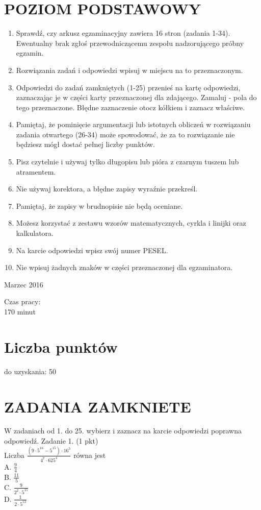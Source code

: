 \documentclass[10pt]{article}
\begin{document}
\section*{POZIOM PODSTAWOWY}
\begin{enumerate}
  \item Sprawdź, czy arkusz egzaminacyjny zawiera 16 stron (zadania 1-34). Ewentualny brak zgłoś przewodniczącemu zespołu nadzorującego próbny egzamin.
  \item Rozwiązania zadań i odpowiedzi wpisuj w miejscu na to przeznaczonym.
  \item Odpowiedzi do zadań zamkniętych (1-25) przenieś na kartę odpowiedzi, zaznaczając je w części karty przeznaczonej dla zdającego. Zamaluj - pola do tego przeznaczone. Błędne zaznaczenie otocz kółkiem i zaznacz właściwe.
  \item Pamiętaj, że pominięcie argumentacji lub istotnych obliczeń w rozwiązaniu zadania otwartego (26-34) może spowodować, że za to rozwiązanie nie będziesz mógł dostać pełnej liczby punktów.
  \item Pisz czytelnie i używaj tylko długopisu lub pióra z czarnym tuszem lub atramentem.
  \item Nie używaj korektora, a błędne zapisy wyraźnie przekreśl.
  \item Pamiętaj, że zapisy w brudnopisie nie będą oceniane.
  \item Możesz korzystać z zestawu wzorów matematycznych, cyrkla i linijki oraz kalkulatora.
  \item Na karcie odpowiedzi wpisz swój numer PESEL.
  \item Nie wpisuj żadnych znaków w części przeznaczonej dla egzaminatora.
\end{enumerate}

Marzec 2016

Czas pracy:\\
170 minut

\section*{Liczba punktów}
do uzyskania: 50

\section*{ZADANIA ZAMKNIETE}
W zadaniach od 1. do 25. wybierz i zaznacz na karcie odpowiedzi poprawna odpowiedź. Zadanie 1. (1 pkt)\\
Liczba \(\frac{\left(9 \cdot 5^{16}-5^{15}\right) \cdot 16^{3}}{4^{7} \cdot 625^{4}}\) równa jest\\
A. \(\frac{9}{4}\)\\
B. \(\frac{11}{5}\)\\
C. \(\frac{9}{2^{2} \cdot 5^{15}}\)\\
D. \(\frac{1}{2 \cdot 5^{12}}\)
\end{document}
